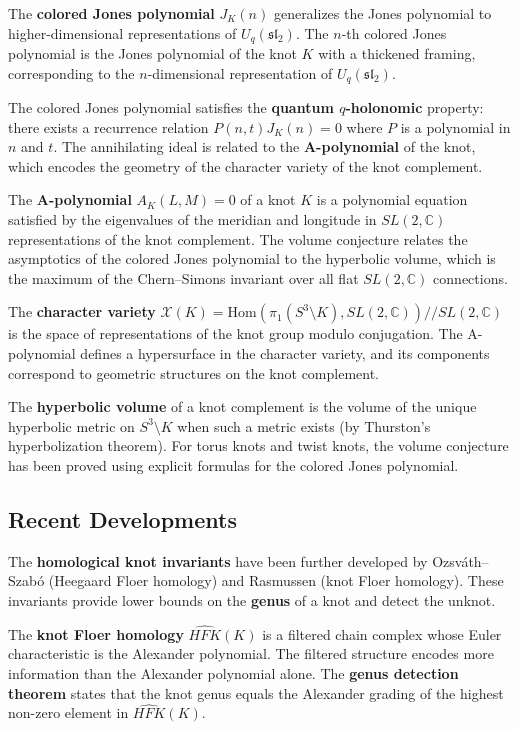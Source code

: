 The \textbf{colored Jones polynomial} $J_K(n)$ generalizes the Jones polynomial to higher-dimensional representations of $U_q(\mathfrak{sl}_2)$. The $n$-th colored Jones polynomial is the Jones polynomial of the knot $K$ with a thickened framing, corresponding to the $n$-dimensional representation of $U_q(\mathfrak{sl}_2)$.

The colored Jones polynomial satisfies the \textbf{quantum $q$-holonomic} property: there exists a recurrence relation $P(n, t) J_K(n) = 0$ where $P$ is a polynomial in $n$ and $t$. The annihilating ideal is related to the \textbf{A-polynomial} of the knot, which encodes the geometry of the character variety of the knot complement.

The \textbf{A-polynomial} $A_K(L, M) = 0$ of a knot $K$ is a polynomial equation satisfied by the eigenvalues of the meridian and longitude in $SL(2, \mathbb{C})$ representations of the knot complement. The volume conjecture relates the asymptotics of the colored Jones polynomial to the hyperbolic volume, which is the maximum of the Chern--Simons invariant over all flat $SL(2, \mathbb{C})$ connections.

The \textbf{character variety} $\mathcal{X}(K) = \text{Hom}(\pi_1(S^3 \setminus K), SL(2, \mathbb{C})) // SL(2, \mathbb{C})$ is the space of representations of the knot group modulo conjugation. The A-polynomial defines a hypersurface in the character variety, and its components correspond to geometric structures on the knot complement.

The \textbf{hyperbolic volume} of a knot complement is the volume of the unique hyperbolic metric on $S^3 \setminus K$ when such a metric exists (by Thurston's hyperbolization theorem). For torus knots and twist knots, the volume conjecture has been proved using explicit formulas for the colored Jones polynomial.

\subsection*{Recent Developments}

The \textbf{homological knot invariants} have been further developed by Ozsváth--Szabó (Heegaard Floer homology) and Rasmussen (knot Floer homology). These invariants provide lower bounds on the \textbf{genus} of a knot and detect the unknot.

The \textbf{knot Floer homology} $\widehat{HFK}(K)$ is a filtered chain complex whose Euler characteristic is the Alexander polynomial. The filtered structure encodes more information than the Alexander polynomial alone. The \textbf{genus detection theorem} states that the knot genus equals the Alexander grading of the highest non-zero element in $\widehat{HFK}(K)$.

